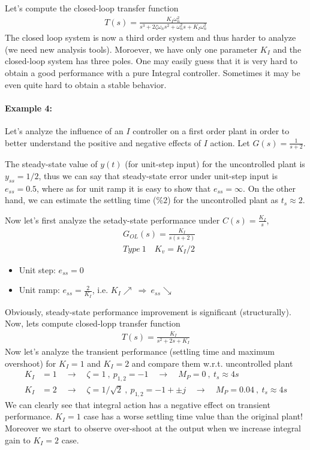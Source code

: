 \documentclass[twoside]{article}
\begin{document}
Let's compute the closed-loop transfer function
%
\begin{align*}
T(s) = \frac{K_I \omega_n^2}{s^3 + 2 \zeta \omega_n s^2 + \omega_n^2 s
  + K_I \omega_n^2}
\end{align*}
The closed loop system is now a third order system and
thus harder to analyze (we need new analysis tools). Moroever, 
we have only one parameter $K_I$ and the closed-loop system has
three poles. One may easily guess that it is very hard to obtain 
a good performance with a pure Integral controller. 
Sometimes it may be even quite hard to obtain a stable behavior.

\paragraph{Example 4:} Let's analyze the influence of an $I$ controller on a
first order plant in order to better understand the positive and
negative effects of $I$ action. Let $G(s) = \frac{1}{s+2}$.

The steady-state value of $y(t)$ (for unit-step input)
for the uncontrolled plant is $y_{ss} = 1/2$, thus we 
can say that steady-state error under unit-step input is 
$e_{ss} = 0.5$, where as for unit ramp it is easy to
show that $e_{ss} = \infty$. On the other hand, we can estimate the
settling time ($\%2$) for the uncontrolled plant as $t_{s} \approx 2.$

Now let's first analyze the setady-state performance under 
$C(s) = \frac{K_I}{s}$,
%
\begin{align*}
  &G_{OL}(s) = \frac{K_I }{s (s + 2)}
\\
 &Type \ 1 \quad K_v = K_I / 2
\end{align*}
% 
\begin{itemize}
\item Unit step: $e_{ss} = 0$ 
\item Unit ramp: $e_{ss} = \frac{2}{K_I}$, i.e. $K_I \nearrow \ \Rightarrow \ e_{ss} \searrow$  
\end{itemize}
Obviously, steady-state performance improvement is 
significant (structurally). Now, lets
compute closed-lopp transfer function
%
\begin{align*}
  T(s) = \frac{K_I}{s^2 + 2 s + K_I}
\end{align*}
%
Now let's analyze the transient performance (settling time and maximum
overshoot) for $K_I = 1$ and $K_I = 2$ and compare them
w.r.t. uncontrolled plant
%
\begin{align*}
  K_I &= 1 \quad \rightarrow \quad \zeta = 1 \ , \ p_{1,2} = -1 \quad
        \rightarrow \quad M_P =0 \ , \ t_{s} \approx 4 s
\\
 K_I &= 2 \quad \rightarrow \quad \zeta = 1/\sqrt{2} \ , \ p_{1,2} =
       -1 + \pm j  \quad
        \rightarrow \quad M_P = 0.04 \ , \ t_{s} \approx 4 s
\end{align*}
% 
We can clearly see that integral action has a negative effect 
on transient performance. $K_I = 1$ case has a worse
settling time value than the original plant! 
Moreover we start to observe over-shoot at the output
when we increase integral gain to $K_I = 2$ case.
\end{document}
